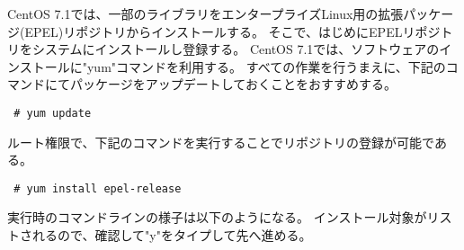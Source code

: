 CentOS 7.1では、一部のライブラリをエンタープライズLinux用の拡張パッケージ(EPEL)リポジトリからインストールする。
そこで、はじめにEPELリポジトリをシステムにインストールし登録する。
CentOS 7.1では、ソフトウェアのインストールに"yum"コマンドを利用する。
すべての作業を行うまえに、下記のコマンドにてパッケージをアップデートしておくことをおすすめする。
\begin{verbatim}
 # yum update
\end{verbatim}

ルート権限で、下記のコマンドを実行することでリポジトリの登録が可能である。
\begin{verbatim}
 # yum install epel-release
\end{verbatim}
実行時のコマンドラインの様子は以下のようになる。
インストール対象がリストされるので、確認して"y"をタイプして先へ進める。\\

